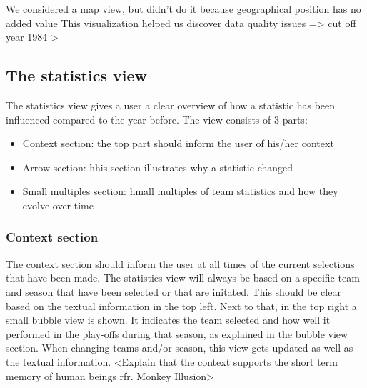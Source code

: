 \documentclass{sigchi}
\begin{document}
We considered a map view, but didn't do it because geographical position has no added value
This visualization helped us discover data quality issues => cut off year 1984
>


\subsection{The statistics view}
The statistics view gives a user a clear overview of how a statistic has been influenced compared to the year before. The view consists of 3 parts:
\begin{itemize}
    \item Context section: the top part should inform the user of his/her
        context
    \item Arrow section: hhis section illustrates why a statistic changed
    \item Small multiples section: hmall multiples of team statistics and how they evolve over time
\end{itemize}

\subsubsection{Context section}
The context section should inform the user at all times of the current selections 
that have been made. The statistics view will always be based on a specific team
and season that have been selected or that are initated. This should be clear based
on the textual information in the top left. Next to that, in the top right a small 
bubble view is shown. It indicates the team selected and how well it performed in 
the play-offs during that season, as explained in the bubble view section. When changing teams and/or season, this view gets 
updated as well as the textual information.
<Explain that the context supports the short term memory of human beings rfr. Monkey Illusion>
\end{document}
